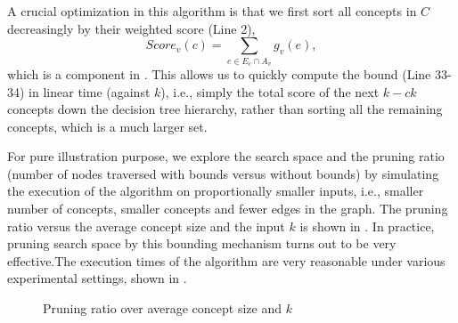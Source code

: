 A crucial optimization in this algorithm is that we first sort
all concepts in $C$ decreasingly by their weighted score (Line 2),
\[Score_v(c) = \sum_{e\in E_c \cap A_v} g_v(e),\]
which is a component in . This allows us to quickly
compute the bound (Line 33-34) in linear time (against $k$), i.e., simply
the total score of the next $k-ck$ concepts down the decision
tree hierarchy, rather than sorting all the remaining concepts,
which is a much larger set.

For pure illustration purpose, we explore
the search space and the pruning ratio (number of nodes traversed with
bounds versus without bounds) by simulating the execution
of the algorithm on proportionally smaller inputs, i.e., smaller
number of concepts, smaller concepts and fewer edges in the graph.
The pruning ratio versus the average concept size and
the input $k$ is shown in .
In practice, pruning search space by this bounding mechanism turns
out to be very effective.The execution times of the algorithm are
very reasonable under various experimental settings,
shown in .

\vspace*{-10mm}
\begin{figure}[th]
\centering
{}
\caption{Pruning ratio over average concept size and $k$}
\label{fig:complexity}
\end{figure}


